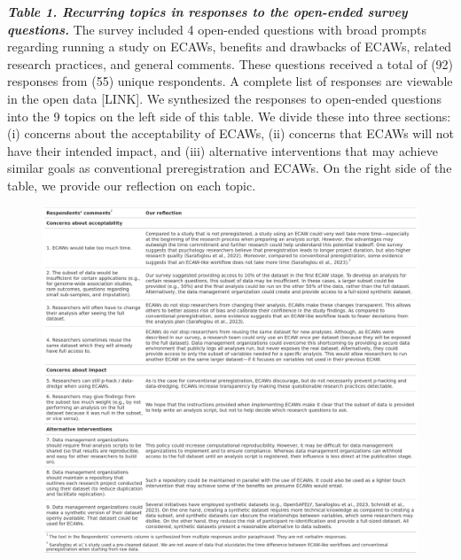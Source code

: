 \documentclass[
  man,floatsintext]{apa6}
\begin{document}
{\smaller[1]
\begin{singlespace}

\textbf{\emph{Table 1. Recurring topics in responses to the open-ended survey questions.}} The survey included 4 open-ended questions with broad prompts regarding running a study on ECAWs, benefits and drawbacks of ECAWs, related research practices, and general comments. These questions received a total of (92) responses from (55) unique respondents. A complete list of responses are viewable in the open data {[}LINK{]}. We synthesized the responses to open-ended questions into the 9 topics on the left side of this table. We divide these into three sections: (i) concerns about the acceptability of ECAWs, (ii) concerns that ECAWs will not have their intended impact, and (iii) alternative interventions that may achieve similar goals as conventional preregistration and ECAWs. On the right side of the table, we provide our reflection on each topic.

\end{singlespace}
}

\begin{figure}

{\centering \includegraphics[width=1\linewidth,height=3\textheight]{figs/open-ended-table_figure} 

}

\caption{ }\label{fig:openEndedTable}
\end{figure}
\end{document}
